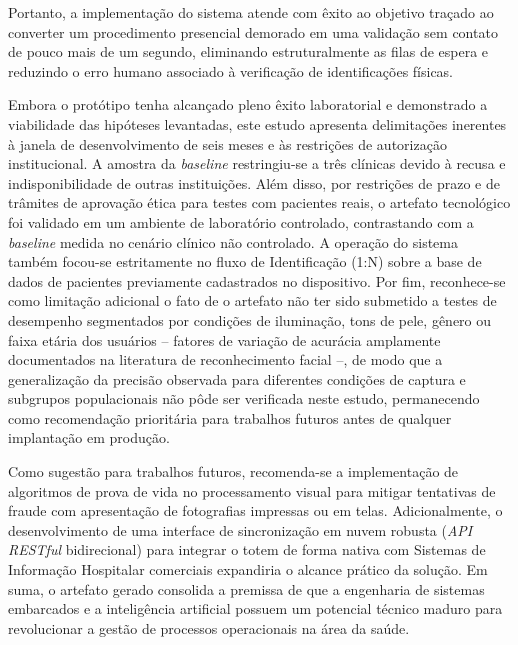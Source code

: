 Portanto, a implementação do sistema atende com êxito ao objetivo traçado ao converter um procedimento presencial demorado em uma validação sem contato de pouco mais de um segundo, eliminando estruturalmente as filas de espera e reduzindo o erro humano associado à verificação de identificações físicas.  

Embora o protótipo tenha alcançado pleno êxito laboratorial e demonstrado a viabilidade das hipóteses levantadas, este estudo apresenta delimitações inerentes à janela de desenvolvimento de seis meses e às restrições de autorização institucional. A amostra da \textit{baseline} restringiu-se a três clínicas devido à recusa e indisponibilidade de outras instituições. Além disso, por restrições de prazo e de trâmites de aprovação ética para testes com pacientes reais, o artefato tecnológico foi validado em um ambiente de laboratório controlado, contrastando com a \textit{baseline} medida no cenário clínico não controlado. A operação do sistema também focou-se estritamente no fluxo de Identificação (1:N) sobre a base de dados de pacientes previamente cadastrados no dispositivo. Por fim, reconhece-se como limitação adicional o fato de o artefato não ter sido submetido a testes de desempenho segmentados por condições de iluminação, tons de pele, gênero ou faixa etária dos usuários -- fatores de variação de acurácia amplamente documentados na literatura de reconhecimento facial --, de modo que a generalização da precisão observada para diferentes condições de captura e subgrupos populacionais não pôde ser verificada neste estudo, permanecendo como recomendação prioritária para trabalhos futuros antes de qualquer implantação em produção.  

Como sugestão para trabalhos futuros, recomenda-se a implementação de algoritmos de prova de vida no processamento visual para mitigar tentativas de fraude com apresentação de fotografias impressas ou em telas. Adicionalmente, o desenvolvimento de uma interface de sincronização em nuvem robusta (\textit{API RESTful} bidirecional) para integrar o totem de forma nativa com Sistemas de Informação Hospitalar comerciais expandiria o alcance prático da solução. Em suma, o artefato gerado consolida a premissa de que a engenharia de sistemas embarcados e a inteligência artificial possuem um potencial técnico maduro para revolucionar a gestão de processos operacionais na área da saúde.  








